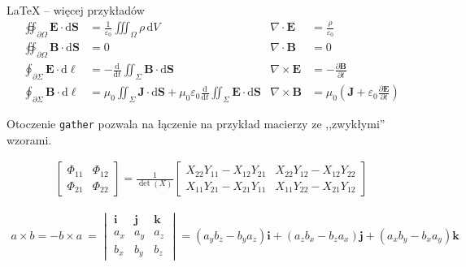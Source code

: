 \begin{easyappendix}{\LaTeX{} -- więcej przykładów}
\begin{align}
	\oiint\nolimits_{\partial \Omega} \pmb{E} \cdot \mathrm{d}\pmb{S} &= \frac{1}{\varepsilon_0} \iiint\nolimits_\Omega \rho \, \mathrm{d}V &  \nabla \cdot \pmb{E} &= \frac {\rho} {\varepsilon_0} \label{eq:maxwell1} \\
	\oiint\nolimits_{\partial \Omega} \pmb{B} \cdot \mathrm{d}\pmb{S} &= 0 & \nabla \cdot \pmb{B} &= 0 \label{eq:maxwell2} \\
	\oint\nolimits_{\partial \Sigma} \pmb{E} \cdot \mathrm{d}\boldsymbol{\ell} &= -\frac{\mathrm{d}}{\mathrm{d}t}\iint\nolimits_{\Sigma}\pmb{B}\cdot\mathrm{d}\pmb{S} & \nabla \times \pmb{E} &= -\frac{\partial \pmb{B}}{\partial t} \label{eq:maxwell3} \\
	\oint\nolimits_{\partial \Sigma} \pmb{B} \cdot \mathrm{d}\boldsymbol{\ell} &= \mu_0 \iint\nolimits_{\Sigma} \pmb{J} \cdot \mathrm{d}\pmb{S} + \mu_0 \varepsilon_0 \frac{\mathrm{d}}{\mathrm{d}t} \iint\nolimits_{\Sigma} \pmb{E} \cdot \mathrm{d}\pmb{S} & \nabla \times \pmb{B} &= \mu_0\left(\pmb{J} + \varepsilon_0 \frac{\partial \pmb{E}} {\partial t} \right) \label{eq:maxwell4}
\end{align}

Otoczenie \texttt{gather} pozwala na łączenie na przykład macierzy ze ,,zwykłymi'' wzorami.

\begin{gather}
	\begin{bmatrix} \Phi_{11} & \Phi_{12} \\ \Phi_{21} & \Phi_{22} \end{bmatrix}
	=
	\frac{1}{\det(X)}
	\begin{bmatrix}
		X_{22} Y_{11} - X_{12} Y_{21} &
		X_{22} Y_{12} - X_{12} Y_{22} \\
		X_{11} Y_{21} - X_{21} Y_{11} &
		X_{11} Y_{22} - X_{21} Y_{12} 
	\end{bmatrix}
\end{gather}

\begin{gather}
	a \times b = -b \times a~= 
	\begin{vmatrix}
		\pmb{i}    &     \pmb{j}      &      \pmb{k}    \\
		a_x        &     a_y          &      a_z        \\
		b_x        &     b_y          &      b_z        
	\end{vmatrix}
	= \left(a_y b_z - b_y a_z \right)\pmb{i} 
	+ \left(a_z b_x - b_z a_x \right)\pmb{j} 
	+ \left(a_x b_y - b_x a_y \right)\pmb{k} 
\end{gather}


\end{easyappendix}
